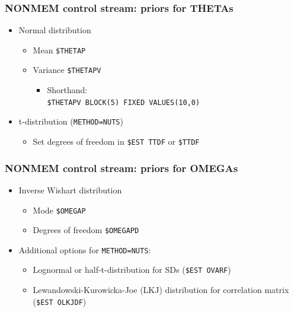 \documentclass{beamer}
\begin{document}
\begin{frame}[fragile]
  \frametitle{NONMEM control stream: priors for THETAs}

\begin{itemize}
  \item<1-> Normal distribution
        \begin{itemize}
          \item Mean \verb|$THETAP|
          \item Variance \verb|$THETAPV|
                \begin{itemize}
                  \item Shorthand: \\
                        \verb|$THETAPV BLOCK(5) FIXED VALUES(10,0)|
                \end{itemize}
        \end{itemize}
  \item<2-> t-distribution (\verb|METHOD=NUTS|)
        \begin{itemize}
          \item Set degrees of freedom in \verb|$EST TTDF| or \verb|$TTDF|
        \end{itemize}
\end{itemize}

\end{frame}

\begin{frame}[fragile]
  \frametitle{NONMEM control stream: priors for OMEGAs}

\begin{itemize}
  \item<1-> Inverse Wishart distribution
  \begin{itemize}
    \item Mode \verb|$OMEGAP|
    \item Degrees of freedom \verb|$OMEGAPD|
  \end{itemize}
  \item<2-> Additional options for \verb|METHOD=NUTS|:
        \begin{itemize}
          \item Lognormal or half-t-distribution for SDs (\verb|$EST OVARF|)
          \item Lewandowski-Kurowicka-Joe (LKJ) distribution for correlation matrix (\verb|$EST OLKJDF|)
        \end{itemize}
\end{itemize}

\end{frame}
\end{document}
